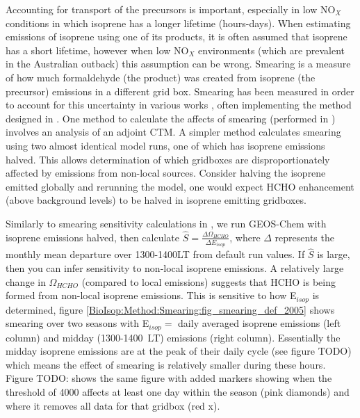     Accounting for transport of the precursors is important, especially in low NO$_X$ conditions in which isoprene has a longer lifetime (hours-days).
    When estimating emissions of isoprene using one of its products, it is often assumed that isoprene has a short lifetime, however when low NO$_X$ environments (which are prevalent in the Australian outback) this assumption can be wrong.
    Smearing is a measure of how much formaldehyde (the product) was created from isoprene (the precursor) emissions in a different grid box.
    Smearing has been measured in order to account for this uncertainty in various works \parencite[eg.][]{Martin2003,Palmer2003,Millet2006,Stavrakou2009,Marais2012,Barkley2013,Zhu2014,Wolfe2016,Surl2018}, often implementing the method designed in \textcite{Palmer2003}.
    One method to calculate the affects of smearing (performed in \textcite{Stavrakou2009}) involves an analysis of an adjoint CTM.
    A simpler method calculates smearing using two almost identical model runs, one of which has isoprene emissions halved.
    This allows determination of which gridboxes are disproportionately affected by emissions from non-local sources.
    Consider halving the isoprene emitted globally and rerunning the model, one would expect HCHO enhancement (above background levels) to be halved in isoprene emitting gridboxes.
    
    Similarly to smearing sensitivity calculations in \textcite{Marais2012}, we run GEOS-Chem with isoprene emissions halved, then calculate $\hat{S} = \frac{\Delta \Omega_{HCHO}}{\Delta E_{isop}} $, where $\Delta$ represents the monthly mean departure over 1300-1400LT from default run values.
    If $\hat{S}$ is large, then you can infer sensitivity to non-local isoprene emissions.
    A relatively large change in $\Omega_{HCHO}$ (compared to local emissions) suggests that HCHO is being formed from non-local isoprene emissions.
    This is sensitive to how E$_{isop}$ is determined, figure \ref{BioIsop:Method:Smearing:fig_smearing_def_2005} shows smearing over two seasons with E$_{isop} =$ daily averaged isoprene emissions (left column) and midday (1300-1400~LT) emissions (right column). 
    Essentially the midday isoprene emissions are at the peak of their daily cycle (see figure TODO) which means the effect of smearing is relatively smaller during these hours.
    Figure TODO: shows the same figure with added markers showing when the threshold of 4000 \parencite[as in][]{Marais2012} affects at least one day within the season (pink diamonds) and where it removes all data for that gridbox (red x).
    
